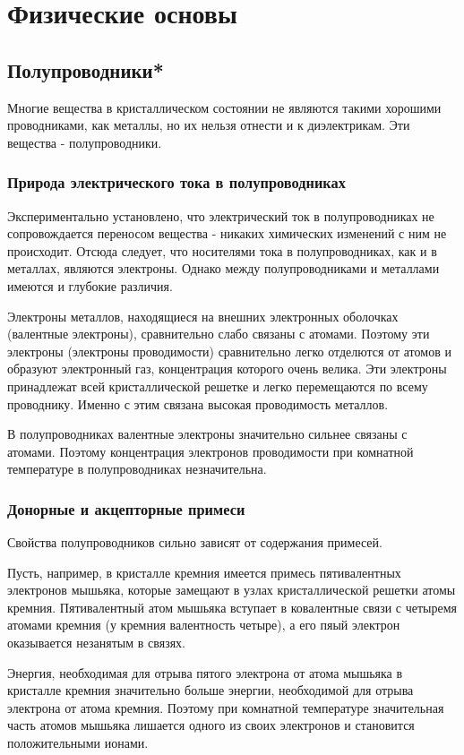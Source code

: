 \documentclass[12pt, a4paper]{article}
\begin{document}
\section{Физические основы}

\subsection{Полупроводники*}
Многие вещества в кристаллическом состоянии не являются такими хорошими проводниками, как металлы, но их нельзя отнести и к диэлектрикам. Эти вещества - полупроводники. 

\subsubsection{Природа электрического тока в полупроводниках}
Экспериментально установлено, что электрический ток в полупроводниках не сопровождается переносом вещества - никаких химических изменений с ним не происходит. Отсюда следует, что носителями тока в полупроводниках, как и в металлах, являются электроны. Однако между полупроводниками и металлами имеются и глубокие различия.

Электроны металлов, находящиеся на внешних электронных оболочках (валентные электроны), сравнительно слабо связаны с атомами. Поэтому эти электроны (электроны проводимости) сравнительно легко отделются от атомов и образуют электронный газ, концентрация которого очень велика. Эти электроны принадлежат всей кристаллической решетке и легко перемещаются по всему проводнику. Именно с этим связана высокая проводимость металлов.

В полупроводниках валентные электроны значительно сильнее связаны с атомами. Поэтому концентрация электронов проводимости при комнатной температуре в полупроводниках незначительна.

\subsubsection{Донорные и акцепторные примеси}
Свойства полупроводников сильно зависят от содержания примесей.

Пусть, например, в кристалле кремния имеется примесь пятивалентных электронов мышьяка, которые замещают в узлах кристаллической решетки атомы кремния. Пятивалентный атом мышьяка вступает в ковалентные связи с четыремя атомами кремния (у кремния валентность четыре), а его пяый электрон оказывается незанятым в связях.

Энергия, необходимая для отрыва пятого электрона от атома мышьяка в кристалле кремния значительно больше энергии, необходимой для отрыва электрона от атома кремния. Поэтому при комнатной температуре значительная часть атомов мышьяка лишается одного из своих электронов и становится положительными ионами.
\end{document}
